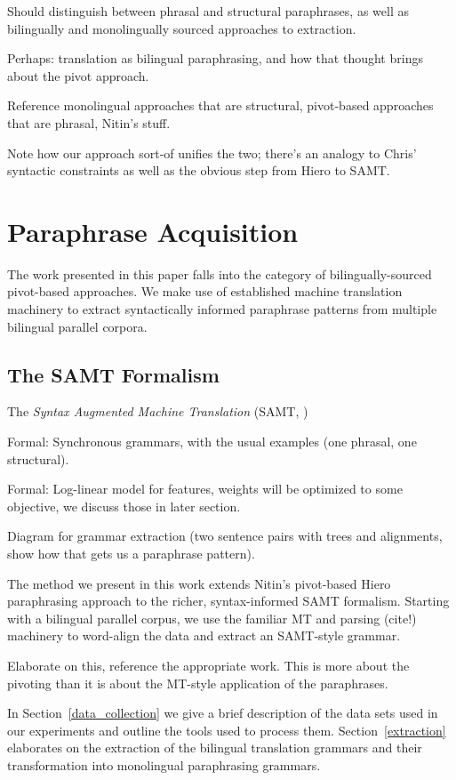 \documentclass[11pt]{article}
\begin{document}
Should distinguish between phrasal and structural paraphrases, as well
as bilingually and monolingually sourced approaches to extraction.

Perhaps: translation as bilingual paraphrasing, and how that thought
brings about the pivot approach.

Reference monolingual approaches that are structural, pivot-based
approaches that are phrasal, Nitin's stuff.

Note how our approach sort-of unifies the two; there's an analogy to
Chris' syntactic constraints as well as the obvious step from Hiero to
SAMT.

\section{Paraphrase Acquisition} \label{acquisition}

The work presented in this paper falls into the category of
bilingually-sourced pivot-based approaches. We make use of established
machine translation machinery to extract syntactically informed
paraphrase patterns from multiple bilingual parallel corpora.


\subsection{The SAMT Formalism}

The \emph{Syntax Augmented Machine Translation} (SAMT,
\cite{Zollmann2006})

Formal: Synchronous grammars, with the usual examples (one phrasal, one
structural).

Formal: Log-linear model for features, weights will be optimized to some
objective, we discuss those in later section.

Diagram for grammar extraction (two sentence pairs with trees and
alignments, show how that gets us a paraphrase pattern). 



The method we present in this work extends Nitin's pivot-based Hiero
paraphrasing approach to the richer, syntax-informed SAMT
formalism. Starting with a bilingual parallel corpus, we use the
familiar MT and parsing (cite!) machinery to word-align the data and
extract an SAMT-style grammar.

Elaborate on this, reference the appropriate work. This is more about
the pivoting than it is about the MT-style application of the
paraphrases.

In Section~\ref{data_collection} we give a brief description of the
data sets used in our experiments and outline the tools used to
process them. Section~\ref{extraction} elaborates on the extraction
of the bilingual translation grammars and their transformation into
monolingual paraphrasing grammars.
\end{document}
